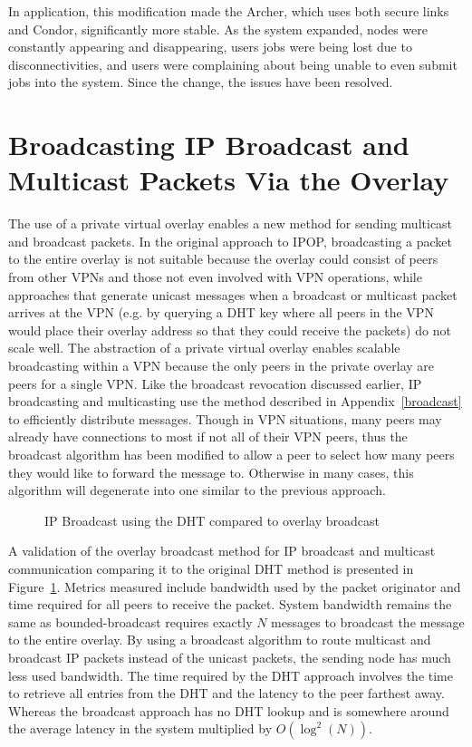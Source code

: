 In application, this modification made the Archer, which uses both secure links
and Condor, significantly more stable.  As the system expanded, nodes were
constantly appearing and disappearing, users jobs were being lost due to
disconnectivities, and users were complaining about being unable to even submit
jobs into the system.  Since the change, the issues have been resolved.

\section{Broadcasting IP Broadcast and Multicast Packets Via the Overlay}

The use of a private virtual overlay enables a new method for sending multicast
and broadcast packets. In the original approach to IPOP, broadcasting a packet
to the entire overlay  is not suitable because the overlay could consist of
peers from other VPNs and those not even involved with VPN operations, while
approaches that generate unicast messages when a broadcast or multicast packet
arrives at the VPN (e.g. by querying a DHT key where all peers in the VPN would
place their overlay address so that they could receive the packets) do not
scale well. The abstraction of a private virtual overlay enables scalable
broadcasting within a VPN because the only peers in the private overlay are
peers for a single VPN.  Like the broadcast revocation discussed earlier, IP
broadcasting and multicasting use the method described in
Appendix~\ref{broadcast} to efficiently distribute messages.  Though in VPN
situations, many peers may already have connections to most if not all of their
VPN peers, thus the broadcast algorithm has been modified to allow a peer to
select how many peers they would like to forward the message to.  Otherwise in
many cases, this algorithm will degenerate into one similar to the previous
approach.  

\begin{figure}
\centering
\caption{IP Broadcast using the DHT compared to overlay broadcast}
\label{fig:ipbroadcast}
\end{figure}

A validation of the overlay broadcast method for IP broadcast and multicast
communication comparing it to the original DHT method is presented in
Figure~\ref{fig:ipbroadcast}.  Metrics measured include bandwidth used by the
packet originator and time required for all peers to receive the packet.
System bandwidth remains the same as bounded-broadcast requires exactly $N$
messages to broadcast the message to the entire overlay.  By using a broadcast
algorithm to route multicast and broadcast IP packets instead of the unicast
packets, the sending node has much less used bandwidth.  The time required by
the DHT approach involves the time to retrieve all entries from the DHT and the
latency to the peer farthest away.  Whereas the broadcast approach has no DHT
lookup and is somewhere around the average latency in the system multiplied by
$O(\log^2(N))$.


